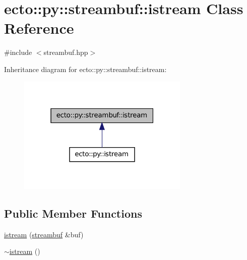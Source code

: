 \hypertarget{classecto_1_1py_1_1streambuf_1_1istream}{\section{ecto\-:\-:py\-:\-:streambuf\-:\-:istream \-Class \-Reference}
\label{classecto_1_1py_1_1streambuf_1_1istream}
}


{\ttfamily \#include $<$streambuf.\-hpp$>$}



\-Inheritance diagram for ecto\-:\-:py\-:\-:streambuf\-:\-:istream\-:\nopagebreak
\begin{figure}[H]
\begin{center}
\leavevmode
\includegraphics[width=232pt]{classecto_1_1py_1_1streambuf_1_1istream__inherit__graph}
\end{center}
\end{figure}
\subsection*{\-Public \-Member \-Functions}
\begin{DoxyCompactItemize}
\item 
\hyperlink{classecto_1_1py_1_1streambuf_1_1istream_aff2d95cb5e4b1113f873b7a7e1cead29}{istream} (\hyperlink{classecto_1_1py_1_1streambuf}{streambuf} \&buf)
\item 
\hyperlink{classecto_1_1py_1_1streambuf_1_1istream_ab53f3c2893d995a22ef2374ce9a00004}{$\sim$istream} ()
\end{DoxyCompactItemize}


